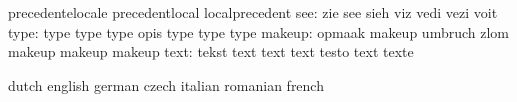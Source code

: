                            precedentelocale          precedentlocal
                           localprecedent
                      see: zie                       see
                           sieh                      viz
                           vedi                      vezi
                           voit
                     type: type                      type
                           type                      opis
                           type                      type
                           type
                   makeup: opmaak                    makeup
                           umbruch                   zlom
                           makeup                    makeup
                           makeup
                     text: tekst                     text
                           text                      text
                           testo                     text
                           texte

\stopelements


\startvariables            dutch                     english
                           german                    czech
                           italian                   romanian
                           french

